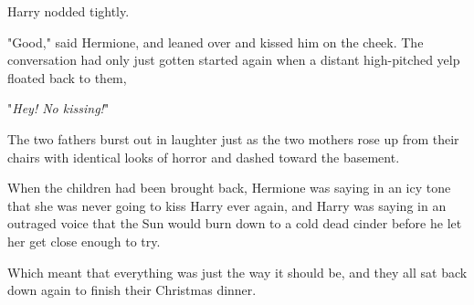 Harry nodded tightly.

"Good," said Hermione, and leaned over and kissed him on the cheek.
\sbreak
The conversation had only just gotten started again when a distant high-pitched
yelp floated back to them,

"\emph{Hey! No kissing!}"

The two fathers burst out in laughter just as the two mothers rose up from
their chairs with identical looks of horror and dashed toward the basement.

When the children had been brought back, Hermione was saying in an icy tone
that she was never going to kiss Harry ever again, and Harry was saying in an
outraged voice that the Sun would burn down to a cold dead cinder before he let
her get close enough to try.

Which meant that everything was just the way it should be, and they all sat
back down again to finish their Christmas dinner.
